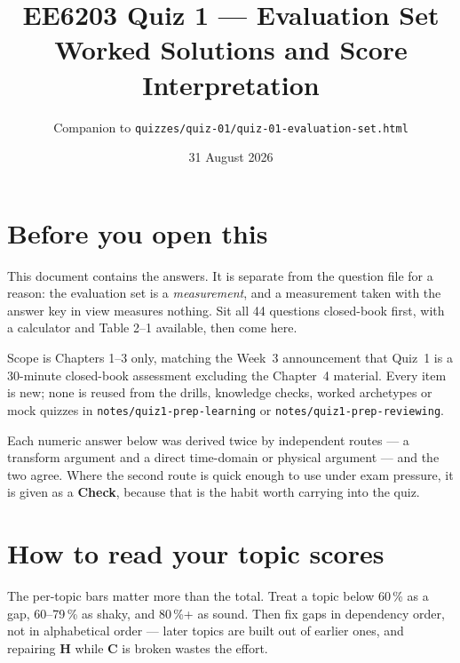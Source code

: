 \documentclass[10pt]{article}
\title{EE6203 Quiz 1 --- Evaluation Set\\\large Worked Solutions and Score Interpretation}
\author{Companion to \texttt{quizzes/quiz-01/quiz-01-evaluation-set.html}}
\date{31 August 2026}
\begin{document}
\maketitle

\section*{Before you open this}

This document contains the answers. It is separate from the question file for a
reason: the evaluation set is a \emph{measurement}, and a measurement taken with
the answer key in view measures nothing. Sit all 44 questions closed-book first,
with a calculator and Table 2--1 available, then come here.

Scope is Chapters 1--3 only, matching the Week~3 announcement that Quiz~1 is a
30-minute closed-book assessment excluding the Chapter~4 material. Every item is
new; none is reused from the drills, knowledge checks, worked archetypes or mock
quizzes in \texttt{notes/quiz1-prep-learning} or \texttt{notes/quiz1-prep-reviewing}.

Each numeric answer below was derived twice by independent routes --- a transform
argument and a direct time-domain or physical argument --- and the two agree. Where
the second route is quick enough to use under exam pressure, it is given as a
\textbf{Check}, because that is the habit worth carrying into the quiz.

\section*{How to read your topic scores}

The per-topic bars matter more than the total. Treat a topic below 60\,\% as a gap,
60--79\,\% as shaky, and 80\,\%+ as sound. Then fix gaps in dependency order, not in
alphabetical order --- later topics are built out of earlier ones, and repairing
\textbf{H} while \textbf{C} is broken wastes the effort.
\end{document}
